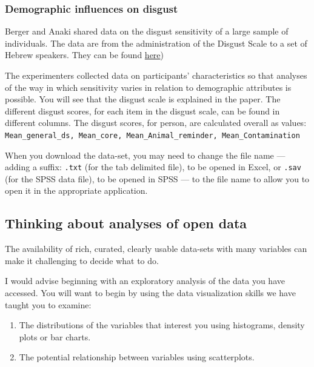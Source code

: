\documentclass[
  letterpaper,
  DIV=11,
  numbers=noendperiod]{scrreprt}
\providecommand{\tightlist}{%
  \setlength{\itemsep}{0pt}\setlength{\parskip}{0pt}}\usepackage{longtable,booktabs,array}
\begin{document}
\hypertarget{sec-how-disgust}{%
\subsubsection{Demographic influences on
disgust}\label{sec-how-disgust}}

Berger and Anaki shared data on the disgust sensitivity of a large
sample of individuals. The data are from the administration of the
Disgust Scale to a set of Hebrew speakers. They can be found
\href{http://openpsychologydata.metajnl.com/articles/10.5334/jopd.ag/}{here})

The experimenters collected data on participants' characteristics so
that analyses of the way in which sensitivity varies in relation to
demographic attributes is possible. You will see that the disgust scale
is explained in the paper. The different disgust scores, for each item
in the disgust scale, can be found in different columns. The disgust
scores, for person, are calculated overall as values:
\texttt{Mean\_general\_ds,\ Mean\_core,\ Mean\_Animal\_reminder,\ Mean\_Contamination}

When you download the data-set, you may need to change the file name ---
adding a suffix: \texttt{.txt} (for the tab delimited file), to be
opened in Excel, or \texttt{.sav} (for the SPSS data file), to be opened
in SPSS --- to the file name to allow you to open it in the appropriate
application.

\hypertarget{sec-openanalysis}{%
\subsection{Thinking about analyses of open
data}\label{sec-openanalysis}}

The availability of rich, curated, clearly usable data-sets with many
variables can make it challenging to decide what to do.

I would advise beginning with an exploratory analysis of the data you
have accessed. You will want to begin by using the data visualization
skills we have taught you to examine:

\begin{enumerate}
\def\labelenumi{\arabic{enumi}.}
\tightlist
\item
  The distributions of the variables that interest you using histograms,
  density plots or bar charts.
\item
  The potential relationship between variables using scatterplots.
\end{enumerate}
\end{document}

